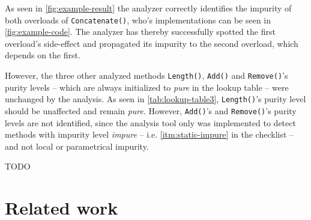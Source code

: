 \documentclass[a4paper,12pt]{article}
\begin{document}
As seen in \autoref{fig:example-result} the analyzer correctly identifies the impurity of both overloads of \texttt{Concatenate()}, who's implementations can be seen in \autoref{fig:example-code}. The analyzer has thereby successfully spotted the first overload's side-effect and propagated its impurity to the second overload, which depends on the first.

However, the three other analyzed methods \texttt{Length()}, \texttt{Add()} and \texttt{Remove()}'s purity levels -- which are always initialized to \textit{pure} in the lookup table -- were unchanged by the analysis. As seen in \autoref{tab:lookup-table3}, \texttt{Length()}'s purity level should be unaffected and remain \textit{pure}. However, \texttt{Add()}'s and \texttt{Remove()}'s purity levels are not identified, since the analysis tool only was implemented to detect methods with impurity level \textit{impure} -- i.e. \autoref{itm:static-impure} in the checklist -- and not local or parametrical impurity.

TODO




\section{Related work} \label{sec:Related work} %
\end{document}
